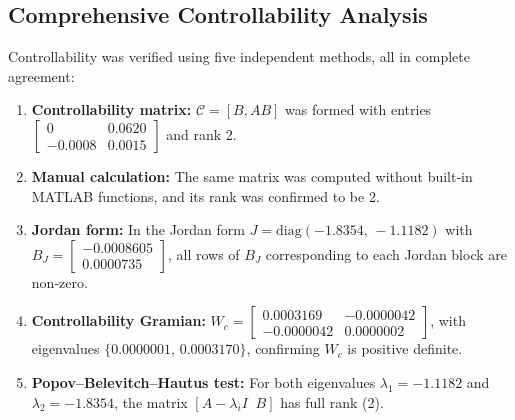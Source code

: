 \documentclass[12pt,a4paper]{article}
\begin{document}
\subsection{Comprehensive Controllability Analysis}
Controllability was verified using five independent methods, all in complete agreement:
\begin{enumerate}
    \item \textbf{Controllability matrix:} $\mathcal{C} = [B, AB]$ was formed with entries $\begin{bmatrix} 0 & 0.0620 \\ -0.0008 & 0.0015 \end{bmatrix}$ and rank 2.
    \item \textbf{Manual calculation:} The same matrix was computed without built‑in MATLAB functions, and its rank was confirmed to be 2.
    \item \textbf{Jordan form:} In the Jordan form $J = \text{diag}(-1.8354,\,-1.1182)$ with $B_J = \begin{bmatrix} -0.0008605 \\ 0.0000735 \end{bmatrix}$, all rows of $B_J$ corresponding to each Jordan block are non‑zero.
    \item \textbf{Controllability Gramian:} $W_c = \begin{bmatrix} 0.0003169 & -0.0000042 \\ -0.0000042 & 0.0000002 \end{bmatrix}$, with eigenvalues $\{0.0000001,\, 0.0003170\}$, confirming $W_c$ is positive definite.
    \item \textbf{Popov–Belevitch–Hautus test:} For both eigenvalues $\lambda_1=-1.1182$ and $\lambda_2=-1.8354$, the matrix $[A-\lambda_i I \;\; B]$ has full rank (2).
\end{enumerate}
\end{document}
